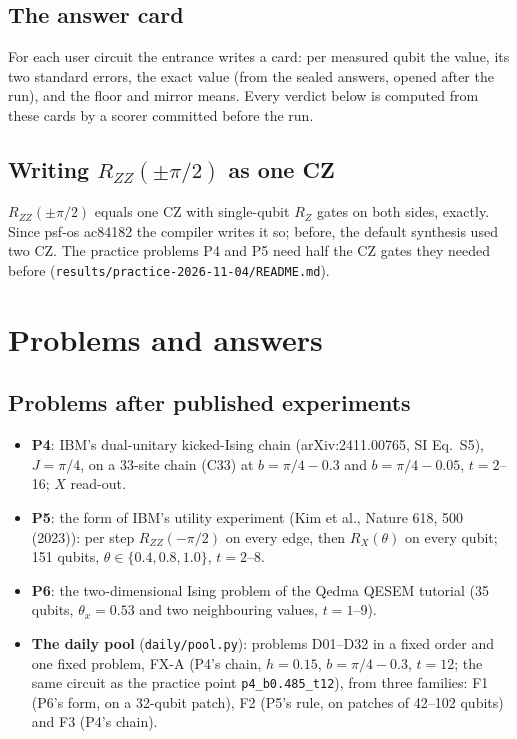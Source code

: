\documentclass[10pt,a4paper]{article}
\begin{document}
\subsection{The answer card}
For each user circuit the entrance writes a card: per measured qubit the value, its two standard errors, the exact
value (from the sealed answers, opened after the run), and the floor and mirror means. Every verdict below is
computed from these cards by a scorer committed before the run.

\subsection{Writing $R_{ZZ}(\pm\pi/2)$ as one CZ}
$R_{ZZ}(\pm\pi/2)$ equals one CZ with single-qubit $R_Z$ gates on both sides, exactly. Since psf-os ac84182 the
compiler writes it so; before, the default synthesis used two CZ. The practice problems P4 and P5 need half the CZ
gates they needed before (\texttt{results/practice-2026-11-04/README.md}).

\section{Problems and answers}

\subsection{Problems after published experiments}
\begin{itemize}
\item \textbf{P4}: IBM's dual-unitary kicked-Ising chain (arXiv:2411.00765, SI Eq.~S5), $J = \pi/4$, on a 33-site
chain (C33) at $b = \pi/4 - 0.3$ and $b = \pi/4 - 0.05$, $t = 2$--16; $X$ read-out.
\item \textbf{P5}: the form of IBM's utility experiment (Kim et al., Nature 618, 500 (2023)): per step
$R_{ZZ}(-\pi/2)$ on every edge, then $R_X(\theta)$ on every qubit; 151 qubits, $\theta \in \{0.4, 0.8, 1.0\}$,
$t = 2$--8.
\item \textbf{P6}: the two-dimensional Ising problem of the Qedma QESEM tutorial (35 qubits, $\theta_x = 0.53$ and
two neighbouring values, $t = 1$--9).
\item \textbf{The daily pool} (\texttt{daily/pool.py}): problems D01--D32 in a fixed order and one fixed problem,
FX-A (P4's chain, $h = 0.15$, $b = \pi/4 - 0.3$, $t = 12$; the same circuit as the practice point
\texttt{p4\_b0.485\_t12}), from three families: F1 (P6's form, on a 32-qubit patch), F2 (P5's rule, on patches of
42--102 qubits) and F3 (P4's chain).
\end{itemize}
\end{document}
